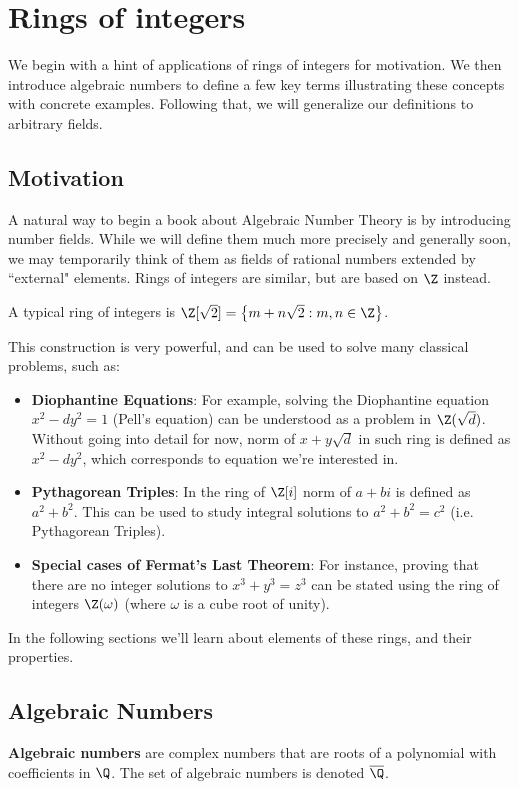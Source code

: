 \chapter{Rings of integers}

We begin with a hint of applications of rings of integers for motivation. We then introduce algebraic numbers to define a few key terms illustrating these concepts with concrete examples. Following that, we will generalize our definitions to arbitrary fields.

\section{Motivation}
A natural way to begin a book about Algebraic Number Theory is by introducing number fields. While we will define them much more precisely and generally soon,
we may temporarily think of them as fields of rational numbers extended by ``external" elements. Rings of integers are similar, but are based on $\Z$ instead.

\begin{ex} A typical ring of integers is $\Z[\sqrt{2}] = \left\{m + n \sqrt{2} : m,n \in \Z\right\}$.
\end{ex}

\noindent This construction is very powerful, and can be used to solve many classical problems, such as:
\begin{itemize}
\item \textbf{Diophantine Equations}: For example, solving the Diophantine equation $x^2 - dy^2 = 1$ (Pell's equation) can be understood as a problem in $\Z(\sqrt{d})$. Without going into detail for now, norm of $x + y\sqrt{d}$ in such ring is defined as $x^2 - dy^2$, which corresponds to equation we're interested in.
\item \textbf{Pythagorean Triples}: In the ring of $\Z[i]$ norm of $a + bi$ is defined as $a^2 + b^2$. This can be used to study integral solutions to $a^2 + b^2 = c^2$ (i.e. Pythagorean Triples).
\item \textbf{Special cases of Fermat's Last Theorem}: For instance, proving that there are no integer solutions to $x^3 + y^3 = z^3$ can be stated using the ring of integers $\Z(\omega)$ (where $\omega$ is a cube root of unity).
\end{itemize}

\noindent In the following sections we'll learn about elements of these rings, and their properties.

\section{Algebraic Numbers}
\begin{df}
\textbf{Algebraic numbers} are complex numbers that are roots of a polynomial with coefficients in $\Q$. The set of algebraic numbers is denoted $\overline{\Q}$.
\end{df}

